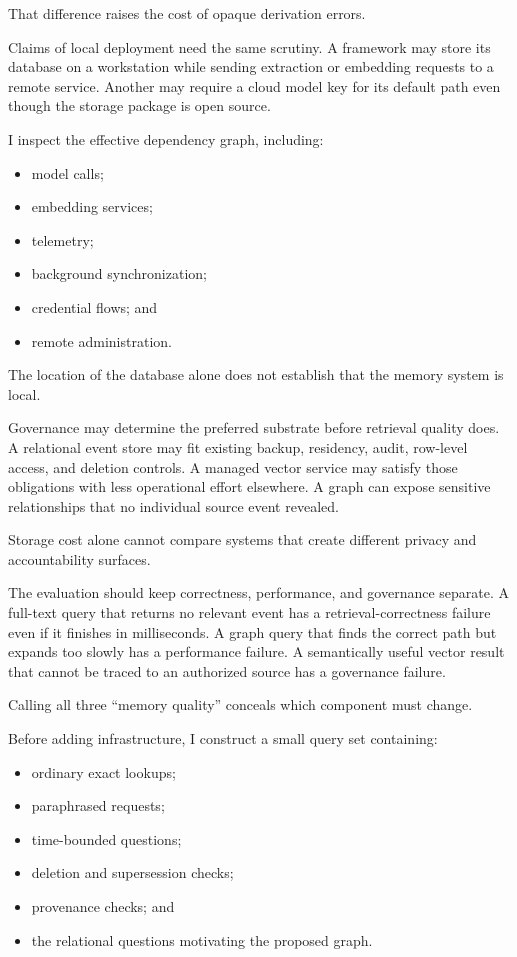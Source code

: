 That difference raises the cost of opaque derivation errors.

Claims of local deployment need the same scrutiny. A framework may store its database on a workstation while sending extraction or embedding requests to a remote service. Another may require a cloud model key for its default path even though the storage package is open source.


I inspect the effective dependency graph, including:

\begin{itemize}
\tightlist
\item
  model calls;
\item
  embedding services;
\item
  telemetry;
\item
  background synchronization;
\item
  credential flows; and
\item
  remote administration.
\end{itemize}

The location of the database alone does not establish that the memory system is local.

Governance may determine the preferred substrate before retrieval quality does. A relational event store may fit existing backup, residency, audit, row-level access, and deletion controls. A managed vector service may satisfy those obligations with less operational effort elsewhere. A graph can expose sensitive relationships that no individual source event revealed.

Storage cost alone cannot compare systems that create different privacy and accountability surfaces.

The evaluation should keep correctness, performance, and governance separate. A full-text query that returns no relevant event has a retrieval-correctness failure even if it finishes in milliseconds. A graph query that finds the correct path but expands too slowly has a performance failure. A semantically useful vector result that cannot be traced to an authorized source has a governance failure.

Calling all three ``memory quality'' conceals which component must change.


Before adding infrastructure, I construct a small query set containing:

\begin{itemize}
\tightlist
\item
  ordinary exact lookups;
\item
  paraphrased requests;
\item
  time-bounded questions;
\item
  deletion and supersession checks;
\item
  provenance checks; and
\item
  the relational questions motivating the proposed graph.
\end{itemize}

